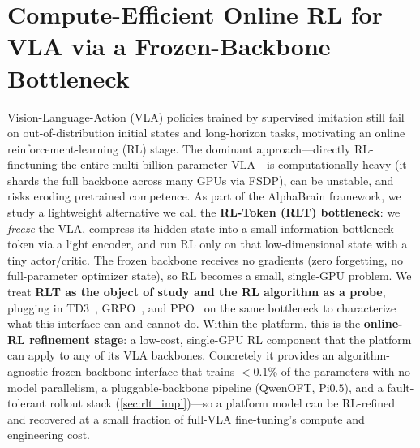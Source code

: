 \newcommand{\sotbd}{\textcolor{black!35}{$\dagger$}} %

\section{Compute-Efficient Online RL for VLA via a Frozen-Backbone Bottleneck}
\label{sec:rlt}

Vision-Language-Action (VLA) policies trained by supervised imitation still fail on out-of-distribution initial states and long-horizon tasks, motivating an online reinforcement-learning (RL) stage. The dominant approach---directly RL-finetuning the entire multi-billion-parameter VLA---is computationally heavy (it shards the full backbone across many GPUs via FSDP), can be unstable, and risks eroding pretrained competence. As part of the AlphaBrain framework, we study a lightweight alternative we call the \textbf{RL-Token (RLT) bottleneck}: we \emph{freeze} the VLA, compress its hidden state into a small information-bottleneck token via a light encoder, and run RL only on that low-dimensional state with a tiny actor/critic. The frozen backbone receives no gradients (zero forgetting, no full-parameter optimizer state), so RL becomes a small, single-GPU problem. We treat \textbf{RLT as the object of study and the RL algorithm as a probe}, plugging in TD3~\citep{fujimoto2018td3}, GRPO~\citep{shao2024grpo}, and PPO~\citep{schulman2017ppo} on the same bottleneck to characterize what this interface can and cannot do. Within the \platform{} platform, this is the \textbf{online-RL refinement stage}: a low-cost, single-GPU RL component that the platform can apply to any of its VLA backbones. Concretely it provides an algorithm-agnostic frozen-backbone interface that trains $<0.1\%$ of the parameters with no model parallelism, a pluggable-backbone pipeline (QwenOFT, Pi$0.5$), and a fault-tolerant rollout stack (\cref{sec:rlt_impl})---so a platform model can be RL-refined and recovered at a small fraction of full-VLA fine-tuning's compute and engineering cost.

